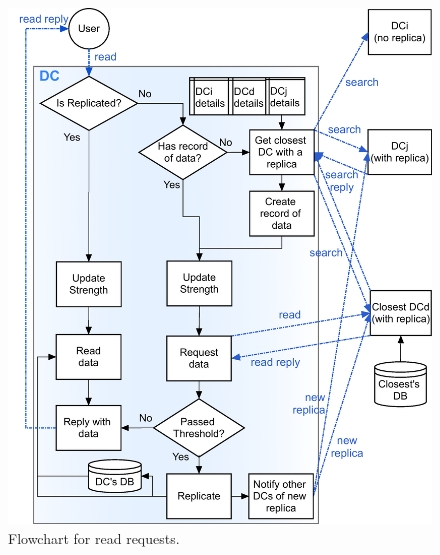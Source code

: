 \documentclass[english]{article}
\begin{document}
\begin{figure}[ht!]
	\includegraphics[width=1\textwidth]{figures/readRequestFlowchart.png}

	\caption{Flowchart for read requests.}
	\label{fig:read_flowchart}
\end{figure}
\end{document}
